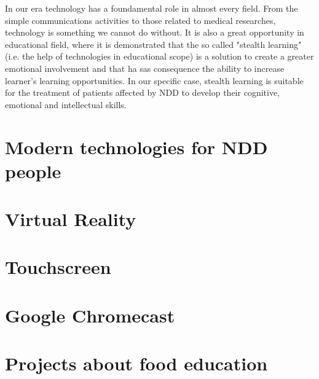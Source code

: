 In our era technology has a foundamental role in almost every field. From the simple communications activities to those related to medical researches, technology is something we cannot do without. It is also a great opportunity in educational field, where it is demonstrated that the so called "stealth learning" (i.e. the help of technologies in educational scope) \cite{Sharp} is a solution to create a greater emotional involvement and that ha sas consequence the ability to increase learner's learning opportunities. In our specific case, stealth learning is suitable for the treatment of patients affected by NDD to develop their cognitive, emotional and intellectual skills.
\section{Modern technologies for NDD people}
\section{Virtual Reality}
\section{Touchscreen}
\section{Google Chromecast}
\section{Projects about food education}

